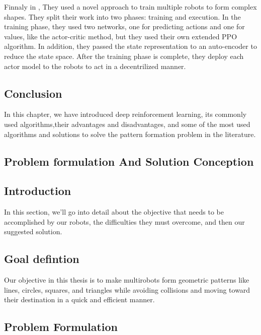 \documentclass[12pt]{extarticle}
\begin{document}
Finnaly in \cite{wang2019pattern}, They used a novel approach to train multiple robots to form complex shapes. They split their work into two phases: training and execution. In the training phase, they used two networks, one for predicting actions and one for values, like the actor-critic method, but they used their own extended PPO algorithm. In addition, they passed the state representation to an auto-encoder to reduce the state space. After the training phase is complete, they deploy each actor model to the robots to act in a decentrilized manner.
\subsection{Conclusion}
In this chapter, we have introduced deep reinforcement learning, its commonly used algorithms,their advantages and disadvantages, and some of the most used algorithms and solutions to solve the pattern formation problem in the literature.


 

  
  
  
\newpage
\pagebreak
\hspace{0pt}
\vfill
\begin{center}
\section{Problem formulation And Solution Conception}
\end{center}
\vfill
\hspace{0pt}

\pagebreak

 

\subsection{Introduction}
In this section, we'll go into detail about the objective that needs to be accomplished by our robots, the difficulties they must overcome, and then our suggested solution.
\subsection{Goal defintion}
Our objective in this thesis is to make multirobots form geometric patterns like lines, circles, squares, and triangles while avoiding collisions and moving toward their destination in a quick and efficient manner. 



\subsection{Problem Formulation}
 
\end{document}
